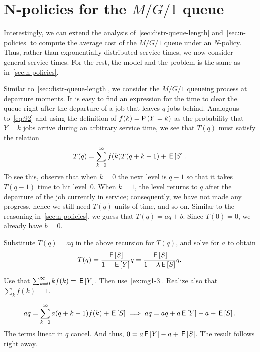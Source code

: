 \section{N-policies for the $M/G/1$ queue}
\label{sec:n-policies-mg1}

Interestingly, we can extend the analysis of~\cref{sec:distr-queue-length} and~\cref{sec:n-policies} to compute the average cost of the $M/G/1$ queue under an $N$-policy.
Thus, rather than exponentially distributed service times, we now consider general service times.
For the rest, the model and the problem is the same as in~\cref{sec:n-policies}. 



Similar to~\cref{sec:distr-queue-length}, we consider the $M/G/1$ queueing process at departure moments.
It is easy to find an expression for the time to clear the queue right after the departure of a job that leaves $q$ jobs behind.
Analogous to~\cref{eq:92} and using the definition of $f(k)=\P{Y=k}$ as the probability that $Y=k$ jobs arrive during an arbitrary service time, we see that $T(q)$ must satisfy the relation
\begin{equation*}
  T(q) = \sum_{k=0}^\infty f(k) T(q+k-1) + \,\mathsf{E}\left[S\right].
\end{equation*}
To see this, observe that when $k=0$ the next level is $q-1$ so that it takes $T(q-1)$ time to hit level~$0$.
When $k=1$, the level returns to $q$ after the departure of the job currently in service; consequently, we have not made any progress, hence we still need $T(q)$ units of time,  and so on.
Similar to the reasoning in~\cref{sec:n-policies}, we guess that $T(q) = a q + b$. Since $T(0)=0$, we already have $b=0$. 

\begin{exercise}
Substitute $T(q) = a q$ in the above recursion for $T(q)$, and solve for $a$ to obtain
\begin{equation*}
  T(q) = \frac{\,\mathsf{E}\left[S\right]}{1- \,\mathsf{E}\left[Y\right]}q = \frac{\,\mathsf{E}\left[S\right]}{1-\lambda \,\mathsf{E}\left[S\right]}q.
\end{equation*}
\begin{hint}
  Use that $\sum_{k=0}^\infty k f(k) = \,\mathsf{E}\left[Y\right]$. Then use~\cref{ex:mg1-3}. Realize also that $\sum_k f(k) = 1$. 
\end{hint}
\begin{solution}
  \begin{align*}
    a q = \sum_{k=0}^\infty a (q+k-1) f(k) + \,\mathsf{E}\left[S\right] \implies a q = a q + a \,\mathsf{E}\left[Y\right] - a + \,\mathsf{E}\left[S\right].
  \end{align*}
The terms linear in $q$ cancel. And thus, $0=a\,\mathsf{E}\left[Y\right] - a + \,\mathsf{E}\left[S\right]$. The result follows right away.
\end{solution}
\end{exercise}

